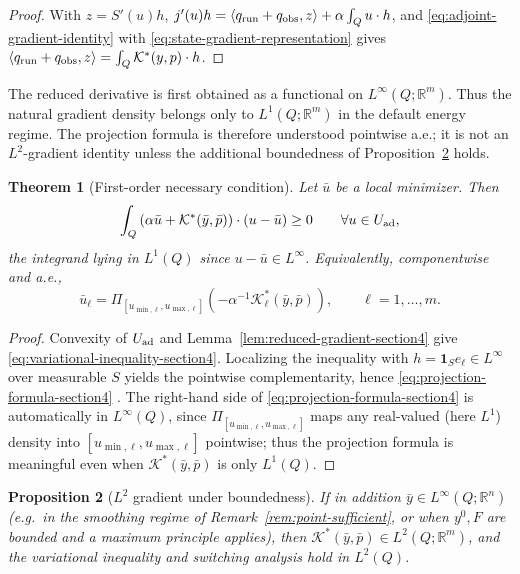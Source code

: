 \documentclass[pdflatex,sn-mathphys-num]{sn-jnl}
\theoremstyle{plain}
\newtheorem{theorem}{Theorem}[section]
\newtheorem{proposition}[theorem]{Proposition}
\theoremstyle{definition}
\theoremstyle{remark}
\newcommand{\R}{\mathbb R}
\begin{document}
\begin{proof}
With $z=S'(u)h$, $j'(u)h=\langle q_{\rm run}+q_{\rm obs},z\rangle+\alpha\int_Q
u\cdot h$, and \eqref{eq:adjoint-gradient-identity} with
\eqref{eq:state-gradient-representation} gives $\langle q_{\rm run}+q_{\rm
obs},z\rangle=\int_Q\mathcal K^*(y,p)\cdot h$.
\end{proof}

The reduced derivative is first obtained as a functional on
\(L^\infty(Q;\R^m)\). Thus the natural gradient density belongs only to
\(L^1(Q;\R^m)\) in the default energy regime. The projection formula is
therefore understood pointwise a.e.; it is not an \(L^2\)-gradient identity
unless the additional boundedness of Proposition~\ref{prop:Kstar-L2} holds.

\begin{theorem}[First-order necessary condition]
\label{thm:first-order-section4}
Let $\bar u$ be a local minimizer. Then
\begin{equation}
\label{eq:variational-inequality-section4}
\int_Q
\left(
\alpha\bar u+\mathcal K^*(\bar y,\bar p)
\right)\cdot(u-\bar u)
\ge0
\qquad
\forall u\in U_{\rm ad},
\end{equation}
the integrand lying in $L^1(Q)$ since $u-\bar u\in L^\infty$. Equivalently,
componentwise and a.e.,
\begin{equation}
\label{eq:projection-formula-section4}
\bar u_\ell
=
\Pi_{[u_{\min,\ell},u_{\max,\ell}]}
\left(
-\alpha^{-1}\mathcal K_\ell^*(\bar y,\bar p)
\right),
\qquad
\ell=1,\ldots,m .
\end{equation}
\end{theorem}

\begin{proof}
Convexity of $U_{\rm ad}$ and Lemma~\ref{lem:reduced-gradient-section4} give
\eqref{eq:variational-inequality-section4}. Localizing the inequality with
$h=\mathbf1_S e_\ell\in L^\infty$ over measurable $S$ yields the pointwise
complementarity, hence \eqref{eq:projection-formula-section4} \cite{troltzsch2010optimal}.
The right-hand side of \eqref{eq:projection-formula-section4} is automatically
in $L^\infty(Q)$, since $\Pi_{[u_{\min,\ell},u_{\max,\ell}]}$ maps any
real-valued (here $L^1$) density into $[u_{\min,\ell},u_{\max,\ell}]$
pointwise; thus the projection formula is meaningful even when
$\mathcal K^*(\bar y,\bar p)$ is only $L^1(Q)$.
\end{proof}

\begin{proposition}[$L^2$ gradient under boundedness]
\label{prop:Kstar-L2}
If in addition $\bar y\in L^\infty(Q;\R^n)$ (e.g.\ in the smoothing regime of
Remark~\ref{rem:point-sufficient}, or when $y^0,F$ are bounded and a maximum
principle applies), then $\mathcal K^*(\bar y,\bar p)\in L^2(Q;\R^m)$, and the
variational inequality and switching analysis hold in $L^2(Q)$.
\end{proposition}
\end{document}
